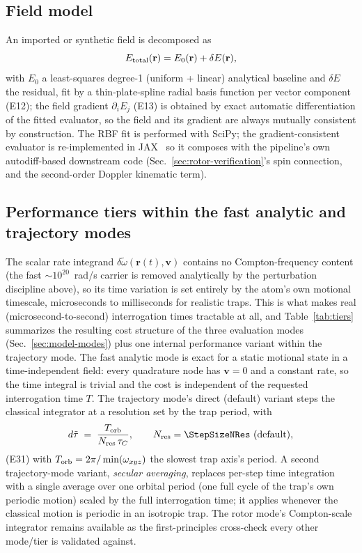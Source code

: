 \documentclass[aps,pra,superscriptaddress,groupedaddress,nofootinbib]{revtex4-2}
\begin{document}
\subsection{Field model}

An imported or synthetic field is decomposed as
\begin{equation}
  E_{\rm total}(\mathbf{r}) = E_0(\mathbf{r}) + \delta E(\mathbf{r}) ,
  \label{eq:e11}
\end{equation}
with $E_0$ a least-squares degree-1 (uniform + linear) analytical
baseline and $\delta E$ the residual, fit by a thin-plate-spline radial
basis function per vector component (E12); the field gradient
$\partial_iE_j$ (E13) is obtained by exact automatic differentiation of
the fitted evaluator, so the field and its gradient are always
mutually consistent by construction. The RBF fit is performed with SciPy; the
gradient-consistent evaluator is re-implemented in
JAX~\cite{Jax2018} so it composes
with the pipeline's own autodiff-based downstream code
(Sec.~\ref{sec:rotor-verification}'s spin connection, and the second-order
Doppler kinematic term).

\subsection{Performance tiers within the fast analytic and trajectory modes}
\label{sec:tiers}

The scalar rate integrand $\delta\tilde\omega(\mathbf{r}(t),\mathbf{v})$
contains no Compton-frequency content (the fast $\sim10^{20}$~rad/s
carrier is removed analytically by the perturbation discipline above),
so its time variation is set entirely by the atom's own motional
timescale, microseconds to milliseconds for realistic traps. This is
what makes real (microsecond-to-second)
interrogation times tractable at all, and Table~\ref{tab:tiers} summarizes
the resulting cost structure of the three evaluation modes
(Sec.~\ref{sec:model-modes}) plus one internal performance variant within
the trajectory mode. The fast analytic mode is exact for a static
motional state in a time-independent field: every quadrature node has
$\mathbf{v}=0$ and a constant rate, so the time integral is trivial and
the cost is independent of the requested interrogation time $T$. The
trajectory mode's direct (default) variant steps the classical
integrator at a resolution set by the trap period, with
\begin{equation}
  d\tilde\tau \;=\; \frac{T_{\rm orb}}{N_{\rm res}\,\tau_C} ,
  \qquad N_{\rm res} = \StepSizeNRes~\text{(default)},
  \label{eq:e31}
\end{equation}
(E31) with $T_{\rm orb}=2\pi/\min(\omega_{xyz})$ the slowest trap axis's
period. A second trajectory-mode variant, \emph{secular averaging},
replaces per-step time integration with a single average over one
orbital period (one full cycle of the trap's own periodic motion) scaled
by the full interrogation time; it applies whenever the classical motion
is periodic in an isotropic trap. The rotor mode's
Compton-scale integrator remains available as the first-principles
cross-check every other mode/tier is validated against.
\end{document}
